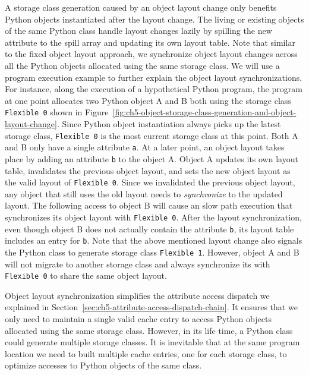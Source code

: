 A storage class generation caused by an object layout change only benefits Python objects instantiated after the layout change.
The living or existing objects of the same Python class handle layout changes lazily by spilling the new attribute to the spill array and updating its own layout table.
Note that similar to the fixed object layout approach, we synchronize object layout changes across all the Python objects allocated using the same storage class.
We will use a program execution example to further explain the object layout synchronizations.
For instance, along the execution of a hypothetical Python program, the program at one point allocates two Python object \textsf{A} and \textsf{B} both using the storage class \texttt{Flexible 0} shown in Figure~\ref{fig:ch5-object-storage-class-generation-and-object-layout-change}.
Since Python object instantiation always picks up the latest storage class, \texttt{Flexible 0} is the most current storage class at this point.
Both \textsf{A} and \textsf{B} only have a single attribute \texttt{a}.
At a later point, an object layout takes place by adding an attribute \texttt{b} to the object \textsf{A}.
Object \textsf{A} updates its own layout table, invalidates the previous object layout, and sets the new object layout as the valid layout of \texttt{Flexible 0}.
Since we invalidated the previous object layout, any object that still uses the old layout needs to \emph{synchronize} to the updated layout.
The following access to object \textsf{B} will cause an slow path execution that synchronizes its object layout with \texttt{Flexible 0}.
After the layout synchronization, even though object \textsf{B} does not actually contain the attribute \texttt{b}, its layout table includes an entry for \texttt{b}.
Note that the above mentioned layout change also signals the Python class to generate storage class \texttt{Flexible 1}.
However, object \textsf{A} and \textsf{B} will not migrate to another storage class and always synchronize its with \texttt{Flexible 0} to share the same object layout.

Object layout synchronization simplifies the attribute access dispatch we explained in Section~\ref{sec:ch5-attribute-access-dispatch-chain}.
It ensures that we only need to maintain a single valid cache entry to access Python objects allocated using the same storage class.
However, in its life time, a Python class could generate multiple storage classes.
It is inevitable that at the same program location we need to built multiple cache entries, one for each storage class, to optimize accesses to Python objects of the same class.

